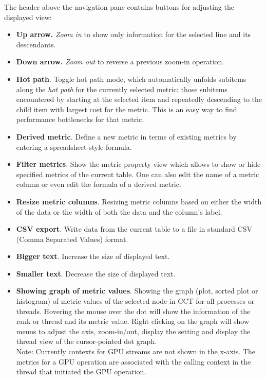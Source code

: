 \documentclass[english]{article}
\begin{document}
\begin{itemize}
The header above the navigation pane contains buttons for adjusting the displayed view:

\begin{itemize}

\item \textbf{Up arrow.} \emph{Zoom in} to show only information for the selected line and its descendants.

\item \textbf{Down arrow.} \emph{Zoom out} to reverse a previous zoom-in operation.

\item \textbf{Hot path}. Toggle hot path mode,
which automatically unfolds subitems along the \emph{hot path} for the currently selected metric:
those subitems encountered by starting at the selected item
and repeatedly descending to the child item with largest cost for the metric.
This is an easy way to find performance bottlenecks for that metric.

\item \textbf{Derived metric}. Define a new metric in terms of existing metrics
by entering a spreadsheet-style formula.

\item \textbf{Filter metrics}. Show the metric property view which allows to show or hide specified metrics of the current table.
One can also edit the name of a metric column or even edit the formula of a derived metric.

\item \textbf{Resize metric columns}. Resizing metric columns based on either the width of the data
	or the width of both the data and the column's label.

\item \textbf{CSV export}. Write data from the current table to a file
in standard CSV (Comma Separated Values) format.

\item \textbf{Bigger text}. Increase the size of displayed text.

\item \textbf{Smaller text}. Decrease the size of displayed text.

\item \textbf{Showing graph of metric values}.
Showing the graph (plot, sorted plot or histogram) of metric values of the selected node in CCT for all processes or threads.
Hovering the mouse over the dot will show the information of the rank or thread and its metric value.
Right clicking on the graph will show menus to adjust the axis, zoom-in/out, display the setting and display the thread view of the cursor-pointed dot graph.\\
Note: Currently contexts for GPU streams are not shown in the x-axis.
The metrics for a GPU operation are associated with the calling context in the thread that initiated the GPU operation.


\end{itemize}
\end{itemize}
\end{document}
